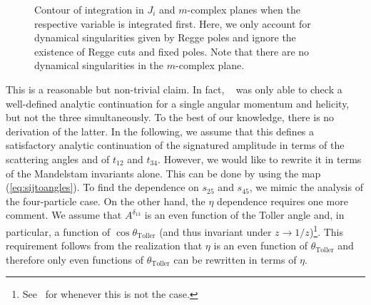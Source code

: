 \begin{figure}[t]
\begin{subfigure}{0.5\textwidth}
  \end{subfigure}
  \caption{Contour of integration in $J_i$ and $m$-complex planes when the respective variable is integrated first.
    Here, we only account for dynamical singularities given by Regge poles and ignore the existence of Regge cuts and fixed poles.
    Note that there are no dynamical singularities in the $m$-complex plane.}
  \label{fig:jandmplanescontours}
\end{figure}
This is a reasonable but non-trivial claim.
In fact, ~\cite{White:1972rq,White:1972sc} was only able to check a well-defined analytic continuation for a single angular momentum and helicity, but not the three simultaneously.
To the best of our knowledge, there is no derivation of the latter.
In the following, we assume that this defines a satisfactory analytic continuation of the signatured amplitude in terms of the scattering angles and of $t_{12}$ and $t_{34}$.
However, we would like to rewrite it in terms of the Mandelstam invariants alone.
This can be done by using the map   (\ref{eq:sijtoangles}).
To find the dependence on $s_{25}$ and $s_{45}$, we mimic the analysis of the four-particle case.
On the other hand, the $\eta$ dependence requires one more comment.
We assume that $A^{\delta_{13}}$ is an even function of the Toller angle and, in particular, a function of $\cos\theta_{\text{Toller}}$ (and thus invariant under $z\to 1/z$)\footnote{See~\cite{Weis:1972tbu} for whenever this is not the case.}.
This requirement follows from the realization that $\eta$ is an even function of $\theta_{\text{Toller}}$ and therefore only even functions of $\theta_{\text{Toller}}$ can be rewritten in terms of $\eta$.
